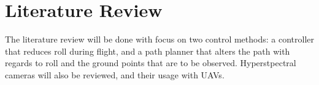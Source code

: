 \section{Literature Review}

The literature review will be done with focus on two control methods: a controller that reduces roll during flight, and a path planner that alters the path with regards to roll and the ground points that are to be observed. Hyperstpectral cameras will also be reviewed, and their usage with UAVs.